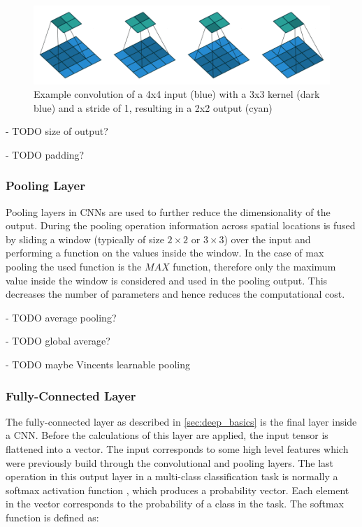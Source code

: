 \begin{figure}
\begin{center}
    \includegraphics[width=16cm]{imgs/conv_example_full.png}
    \caption{Example convolution of a 4x4 input (blue) with a 3x3 kernel (dark blue) and a stride of 1, resulting in a 2x2 output (cyan) \cite{conv_arithmetic}}
    \label{fig:conv_example}
\end{center}
\end{figure}

- TODO size of output?

- TODO padding?

\subsubsection{Pooling Layer}
Pooling layers in \acp{CNN} are used to further reduce the dimensionality of the output.
During the pooling operation information across spatial locations is fused by sliding a window (typically of size $2\times2$ or $3\times3$) over the input and performing a function on the values inside the window.
In the case of max pooling the used function is the $MAX$ function, therefore only the maximum value inside the window is considered and used in the pooling output.
This decreases the number of parameters and hence reduces the computational cost. \cite{dl}

- TODO average pooling?

- TODO global average?

- TODO maybe Vincents learnable pooling

\subsubsection{Fully-Connected Layer}
The fully-connected layer as described in \ref{sec:deep_basics} is the final layer inside a \ac{CNN}.
Before the calculations of this layer are applied, the input tensor is flattened into a vector.
The input corresponds to some high level features which were previously build through the convolutional and pooling layers.
The last operation in this output layer in a multi-class classification task is normally a softmax activation function \cite{softmax}, which produces a probability vector.
Each element in the vector corresponds to the probability of a class in the task.
The softmax function is defined as:

